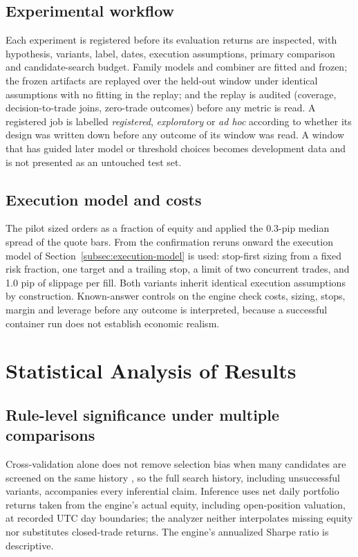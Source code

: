 \subsection{Experimental workflow} \label{subsec:workflow-stages}

Each experiment is registered before its evaluation returns are inspected, with hypothesis, variants, label, dates, execution assumptions, primary comparison and candidate-search budget. Family models and combiner are fitted and frozen; the frozen artifacts are replayed over the held-out window under identical assumptions with no fitting in the replay; and the replay is audited (coverage, decision-to-trade joins, zero-trade outcomes) before any metric is read. A registered job is labelled \emph{registered}, \emph{exploratory} or \emph{ad hoc} according to whether its design was written down before any outcome of its window was read. A window that has guided later model or threshold choices becomes development data and is not presented as an untouched test set.

\subsection{Execution model and costs} \label{subsec:execution-assumptions}

The pilot sized orders as a fraction of equity and applied the 0.3-pip median spread of the quote bars. From the confirmation reruns onward the execution model of Section~\ref{subsec:execution-model} is used: stop-first sizing from a fixed risk fraction, one target and a trailing stop, a limit of two concurrent trades, and 1.0 pip of slippage per fill. Both variants inherit identical execution assumptions by construction. Known-answer controls on the engine check costs, sizing, stops, margin and leverage before any outcome is interpreted, because a successful container run does not establish economic realism.

\section{Statistical Analysis of Results} \label{sec:reproducibility}

\subsection{Rule-level significance under multiple comparisons} \label{subsec:rule-significance}

Cross-validation alone does not remove selection bias when many candidates are screened on the same history \cite{aronson2007evidence,bailey2017overfitting}, so the full search history, including unsuccessful variants, accompanies every inferential claim. Inference uses net daily portfolio returns taken from the engine's actual equity, including open-position valuation, at recorded UTC day boundaries; the analyzer neither interpolates missing equity nor substitutes closed-trade returns. The engine's annualized Sharpe ratio is descriptive.


